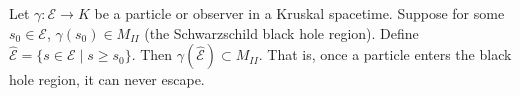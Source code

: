 Let $\gamma: \mathcal{E} \to K$ be a particle or observer in a Kruskal spacetime. Suppose for some $s_0 \in \mathcal{E}$, $\gamma(s_0) \in M_{II}$ (the Schwarzschild black hole region). Define $\hat{\mathcal{E}} = \{s \in \mathcal{E} \mid s \geq s_0\}$. Then $\gamma(\hat{\mathcal{E}}) \subset M_{II}$. That is, once a particle enters the black hole region, it can never escape.
